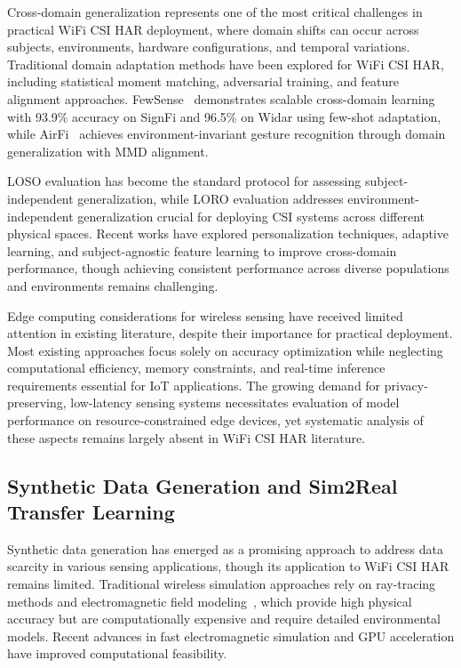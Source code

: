 \documentclass[journal]{IEEEtran}
\begin{document}
Cross-domain generalization represents one of the most critical challenges in practical WiFi CSI HAR deployment, where domain shifts can occur across subjects, environments, hardware configurations, and temporal variations. Traditional domain adaptation methods have been explored for WiFi CSI HAR, including statistical moment matching, adversarial training, and feature alignment approaches. FewSense~\cite{yin2022fewsense} demonstrates scalable cross-domain learning with 93.9\% accuracy on SignFi and 96.5\% on Widar using few-shot adaptation, while AirFi~\cite{wang2022airfi} achieves environment-invariant gesture recognition through domain generalization with MMD alignment.

LOSO evaluation has become the standard protocol for assessing subject-independent generalization, while LORO evaluation addresses environment-independent generalization crucial for deploying CSI systems across different physical spaces. Recent works have explored personalization techniques, adaptive learning, and subject-agnostic feature learning to improve cross-domain performance, though achieving consistent performance across diverse populations and environments remains challenging.

Edge computing considerations for wireless sensing have received limited attention in existing literature, despite their importance for practical deployment. Most existing approaches focus solely on accuracy optimization while neglecting computational efficiency, memory constraints, and real-time inference requirements essential for IoT applications. The growing demand for privacy-preserving, low-latency sensing systems necessitates evaluation of model performance on resource-constrained edge devices, yet systematic analysis of these aspects remains largely absent in WiFi CSI HAR literature.

\subsection{Synthetic Data Generation and Sim2Real Transfer Learning}

Synthetic data generation has emerged as a promising approach to address data scarcity in various sensing applications, though its application to WiFi CSI HAR remains limited. Traditional wireless simulation approaches rely on ray-tracing methods and electromagnetic field modeling~\cite{ray_tracing_wireless2000}, which provide high physical accuracy but are computationally expensive and require detailed environmental models. Recent advances in fast electromagnetic simulation and GPU acceleration have improved computational feasibility.
\end{document}
